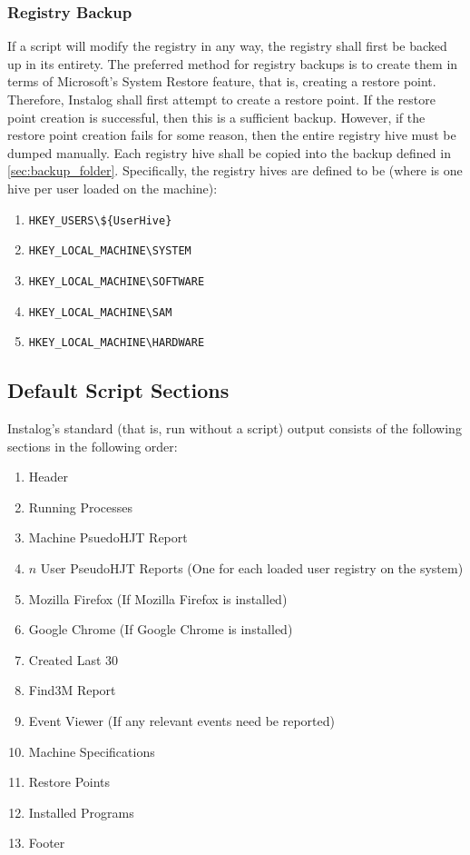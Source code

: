 \subsubsection{Registry Backup} \label{sec:reg_backup}
If a script will modify the registry in any way, the registry shall first be
backed up in its entirety.  The preferred method for registry backups is to
create them in terms of Microsoft's System Restore feature, that is, creating a
restore point. Therefore, Instalog shall first attempt to create a restore point. If
the restore point creation is successful, then this is a sufficient backup.
However, if the restore point creation fails for some reason, then the entire
registry hive must be dumped manually.  Each registry hive shall be copied into
the backup defined in \ref{sec:backup_folder}. Specifically, the registry hives
are defined to be (where  is one hive per user loaded on the
machine):
\begin{enumerate}
    \item \verb|HKEY_USERS\${UserHive}|
    \item \verb|HKEY_LOCAL_MACHINE\SYSTEM|
    \item \verb|HKEY_LOCAL_MACHINE\SOFTWARE|
    \item \verb|HKEY_LOCAL_MACHINE\SAM|
    \item \verb|HKEY_LOCAL_MACHINE\HARDWARE|
\end{enumerate}

\subsection{Default Script Sections} \label{sec:default_script_sections}
Instalog's standard (that is, run without a script) output consists of the
following sections in the following order:
\begin{enumerate}
    \item Header
    \item Running Processes
    \item Machine PsuedoHJT Report
    \item $n$ User PseudoHJT Reports (One for each loaded user registry on the
    system)
    \item Mozilla Firefox (If Mozilla Firefox is installed)
    \item Google Chrome (If Google Chrome is installed)
    \item Created Last 30
    \item Find3M Report
    \item Event Viewer (If any relevant events need be reported)
    \item Machine Specifications
    \item Restore Points
    \item Installed Programs
    \item Footer
\end{enumerate}

